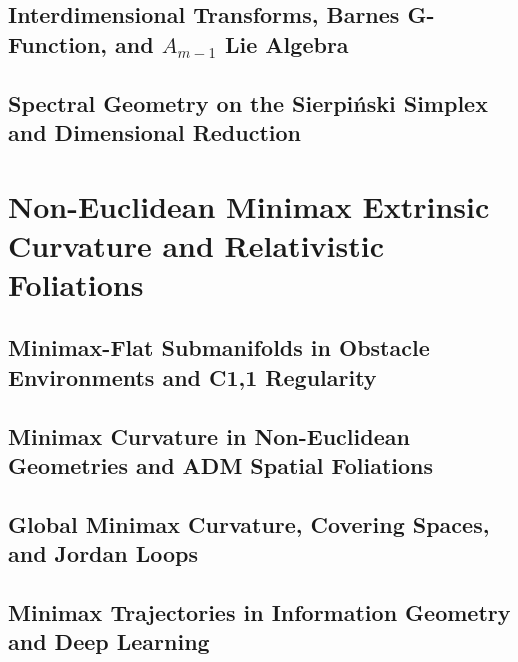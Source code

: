 \documentclass[11pt,a4paper,openright,twoside]{book}
\begin{document}
\chapter[Interdimensional Transforms and Lie Algebras]{Interdimensional Transforms, Barnes G-Function, and $A_{m-1}$ Lie Algebra}


\chapter[Spectral Geometry on the Sierpinski Simplex]{Spectral Geometry on the Sierpi\'nski Simplex and Dimensional Reduction}


\part{Non-Euclidean Minimax Extrinsic Curvature and Relativistic Foliations}

\chapter[Minimax-Flat Submanifolds in Obstacle Environments]{Minimax-Flat Submanifolds in Obstacle Environments and C1,1 Regularity}


\chapter[Minimax Curvature and ADM Foliations]{Minimax Curvature in Non-Euclidean Geometries and ADM Spatial Foliations}


\chapter[Global Minimax Curvature and Jordan Loops]{Global Minimax Curvature, Covering Spaces, and Jordan Loops}


\chapter[Minimax Trajectories in Information Geometry]{Minimax Trajectories in Information Geometry and Deep Learning}

\end{document}
